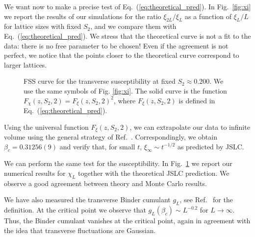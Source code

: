 \documentclass[aps,prl,twocolumn,floatfix,amssymb]{revtex4}
\begin{document}
We want now to make a precise test of Eq.~(\ref{eq:theoretical_pred}). 
In Fig.~\ref{fig:xi} we report the results of our simulations for the ratio 
$\xi_{2L}/\xi_{L}$ as a function of $\xi_{L}/L$ for 
lattice sizes with fixed $S_{2}$, and we compare them with 
Eq.~(\ref{eq:theoretical_pred}). 
We stress that the theoretical curve is not a fit to the 
data: there is no free parameter to be chosen! 
Even if the agreement is not perfect, we notice that the points 
closer to the theoretical curve correspond to larger lattices. 
\begin{figure}[h!] 
 \centering 
{} 
\caption{FSS curve for the transverse correlation length 
at fixed $S_{2}\approx 0.200$. 
Different symbols correspond to different lattice sizes: 
$L=$ $16(\circ )$, $18(\square )$, $20(\triangle )$, $22(\lozenge )$, 
 $24(\bigstar)$. 
The solid curve is the function $F_{\xi}(z,S_2,2)$ 
defined in Eq.~(\ref{eq:theoretical_pred}).} 
 \label{fig:xi} 
 
 \centering 
{} 
\caption{FSS curve for the transverse susceptibility 
at fixed $S_{2}\approx 0.200$. We use the same symbols of Fig. 
\protect\ref{fig:xi}. 
The solid curve is the function 
$F_{\chi}(z,S_2,2) = F_{\xi}(z,S_2,2)^2$, where 
$F_{\xi}(z,S_2,2)$ is 
defined in Eq.~(\ref{eq:theoretical_pred}).} 
 \label{fig:chi} 
\end{figure} 
 
Using the universal function $F_\xi(z,S_2,2)$, we can extrapolate our data to 
infinite volume using the general strategy of Ref.~\cite{Caracciolo}. 
Correspondingly, we obtain 
$ \beta_{c} = 0.31256(9)$ 
and verify that, for small $t$, 
$ \xi_{\infty} \sim t^{-1/2} $ 
as predicted by JSLC. 
 
We can perform the same test for the susceptibility. 
In Fig.~\ref{fig:chi} we report our numerical 
results for $\chi_L$ together with the theoretical JSLC prediction. 
We observe a good agreement between theory and Monte Carlo results. 
 
We have also measured the transverse Binder cumulant $g_L$, 
see Ref.~\cite{Zia} for the definition. 
At the critical point we observe that $g_L(\beta_c) \sim L^{-0.2}$ for $L\to \infty$. Thus, the 
Binder cumulant vanishes at the critical point, 
again in agreement with the idea that transverse fluctuations 
are Gaussian. 
 
\end{document}
